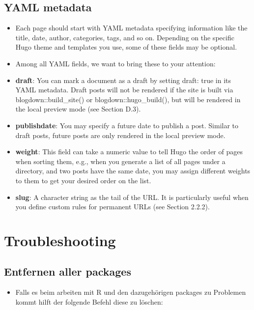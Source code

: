 \documentclass[
]{article}
\providecommand{\tightlist}{%
  \setlength{\itemsep}{0pt}\setlength{\parskip}{0pt}}
\begin{document}
\hypertarget{yaml-metadata-1}{%
\subsection{YAML metadata}\label{yaml-metadata-1}}

\begin{itemize}
\item
  Each page should start with YAML metadata specifying information
  like the title, date, author, categories, tags, and so on. Depending
  on the specific Hugo theme and templates you use, some of these
  fields may be optional.
\item
  Among all YAML fields, we want to bring these to your attention:
\item
  \textbf{draft}: You can mark a document as a draft by setting draft: true
  in its YAML metadata. Draft posts will not be rendered if the site
  is built via blogdown::build\_site() or blogdown::hugo\_build(), but
  will be rendered in the local preview mode (see Section D.3).
\item
  \textbf{publishdate}: You may specify a future date to publish a post.
  Similar to draft posts, future posts are only rendered in the local
  preview mode.
\item
  \textbf{weight}: This field can take a numeric value to tell Hugo the
  order of pages when sorting them, e.g., when you generate a list of
  all pages under a directory, and two posts have the same date, you
  may assign different weights to them to get your desired order on
  the list.
\item
  \textbf{slug}: A character string as the tail of the URL. It is
  particularly useful when you define custom rules for permanent URLs
  (see Section 2.2.2).
\end{itemize}

\hypertarget{troubleshooting}{%
\section{Troubleshooting}\label{troubleshooting}}

\hypertarget{entfernen-aller-packages}{%
\subsection{Entfernen aller packages}\label{entfernen-aller-packages}}

\begin{itemize}
\tightlist
\item
  Falls es beim arbeiten mit R und den dazugehörigen packages zu Problemen kommt hilft der folgende Befehl diese zu löschen:
\end{itemize}
\end{document}
